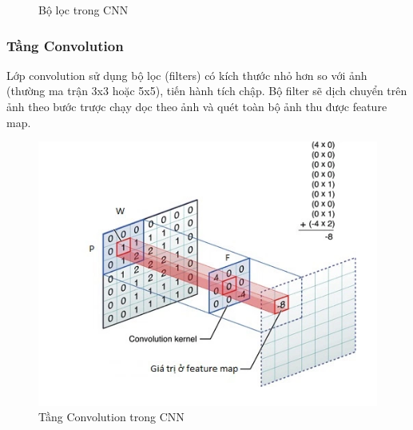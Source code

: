 \begin{itemize}
\begin{center}
\begin{figure}[h!]
\begin{center}
    \end{center}
    \caption{Bộ lọc trong CNN \cite{cnn}} 
    \label{refhinh4}
    \end{figure}
\end{center}
	\end{itemize}


\subsubsection{Tầng Convolution}

Lớp convolution sử dụng bộ lọc (filters) có kích thước nhỏ hơn so với ảnh (thường ma trận 3x3 hoặc 5x5), tiến hành tích chập. Bộ filter sẽ dịch chuyển trên ảnh theo bước trược chạy dọc theo ảnh và quét toàn bộ ảnh thu được feature map.

\begin{center}
    \begin{figure}[h!]
    \begin{center}
     \includegraphics[scale=0.7]{img/convolution_1.png}
    \end{center}
    \caption{Tầng Convolution trong CNN \cite{tangconv}}
    \label{refhinh2}
    \end{figure}
\end{center}

